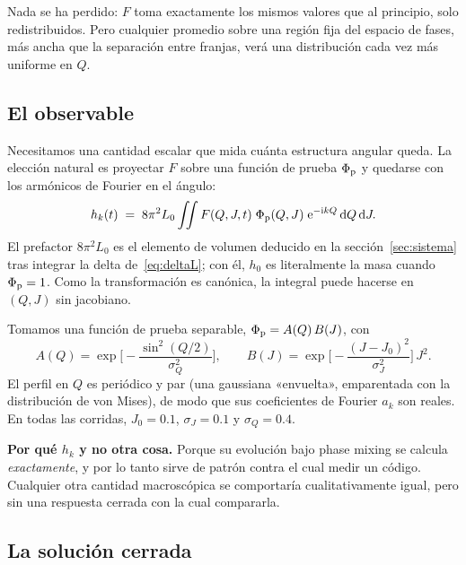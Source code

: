 \documentclass[11pt,a4paper]{article}
\newcommand{\dd}{\mathrm{d}}
\newcommand{\ee}{\mathrm{e}}
\newcommand{\ii}{\mathrm{i}}
\newcommand{\Jr}{J}
\newcommand{\Qr}{Q}
\theoremstyle{definition}
\begin{document}
Nada se ha perdido: $F$ toma exactamente los mismos valores que al principio, solo
redistribuidos. Pero cualquier promedio sobre una región fija del espacio de fases,
más ancha que la separación entre franjas, verá una distribución cada vez más
uniforme en $\Qr$.

\subsection{El observable}

Necesitamos una cantidad escalar que mida cuánta estructura angular queda. La
elección natural es proyectar $F$ sobre una función de prueba $\Phi_{\rm p}$ y
quedarse con los armónicos de Fourier en el ángulo:
\begin{equation}
  h_k(t) \;=\; 8\pi^2 L_0 \iint F(\Qr,\Jr,t)\;\Phi_{\rm p}(\Qr,\Jr)\;
             \ee^{-\ii k \Qr}\,\dd \Qr\,\dd \Jr .
  \label{eq:hk}
\end{equation}
El prefactor $8\pi^2L_0$ es el elemento de volumen deducido en la
sección~\ref{sec:sistema} tras integrar la delta de~\eqref{eq:deltaL}; con él, $h_0$ es literalmente la masa cuando
$\Phi_{\rm p}=1$. Como la transformación es canónica, la integral puede hacerse en
$(\Qr,\Jr)$ sin jacobiano.

Tomamos una función de prueba separable, $\Phi_{\rm p}=A(\Qr)\,B(\Jr)$, con
\begin{equation}
  A(\Qr)=\exp\!\Big[-\frac{\sin^2(\Qr/2)}{\sigma_Q^2}\Big],
  \qquad
  B(\Jr)=\exp\!\Big[-\frac{(\Jr-\Jr_0)^2}{\sigma_J^2}\Big]\,\Jr^2 .
  \label{eq:prueba}
\end{equation}
El perfil en $\Qr$ es periódico y par (una gaussiana «envuelta», emparentada con la
distribución de von Mises), de modo que sus coeficientes de Fourier $a_k$ son
reales. En todas las corridas, $\Jr_0=0.1$, $\sigma_J=0.1$ y $\sigma_Q=0.4$.

\begin{idea}
\textbf{Por qué $h_k$ y no otra cosa.} Porque su evolución bajo phase
mixing se calcula \emph{exactamente}, y por lo tanto sirve de patrón contra el cual
medir un código. Cualquier otra cantidad macroscópica se comportaría
cualitativamente igual, pero sin una respuesta cerrada con la cual compararla.
\end{idea}

\subsection{La solución cerrada}
\end{document}
